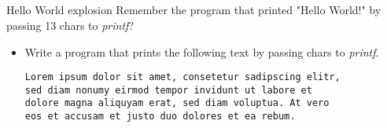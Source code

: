 \subsection{}
\begin{frame}[fragile]{Hello World explosion}
	Remember the program that printed "Hello World!" by passing 13 chars to \textit{printf}?
	\begin{itemize}
		\item Write a program that prints the following text by passing chars to \textit{printf}.
		\begin{lstlisting}[numbers=none]
Lorem ipsum dolor sit amet, consetetur sadipscing elitr,
sed diam nonumy eirmod tempor invidunt ut labore et
dolore magna aliquyam erat, sed diam voluptua. At vero
eos et accusam et justo duo dolores et ea rebum.
\end{lstlisting}
	\end{itemize}
\end{frame}
